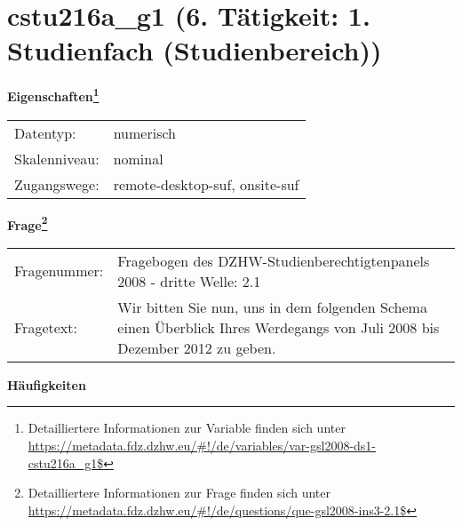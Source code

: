 
    \setcounter{footnote}{0}

    \vspace*{-1.8cm}
	\section{cstu216a\_g1 (6. Tätigkeit: 1. Studienfach (Studienbereich))}
	\label{section:cstu216a_g1}



    \vspace*{0.5cm}
    \noindent\textbf{Eigenschaften\footnote{Detailliertere Informationen zur Variable finden sich unter
		\url{https://metadata.fdz.dzhw.eu/\#!/de/variables/var-gsl2008-ds1-cstu216a_g1$}}}\\
	\begin{tabularx}{\hsize}{@{}lX}
	Datentyp: & numerisch \\
	Skalenniveau: & nominal \\
	Zugangswege: &
	  remote-desktop-suf, 
	  onsite-suf
 \\
    \end{tabularx}



				\vspace*{0.5cm}
                \noindent\textbf{Frage\footnote{Detailliertere Informationen zur Frage finden sich unter
		              \url{https://metadata.fdz.dzhw.eu/\#!/de/questions/que-gsl2008-ins3-2.1$}}}\\
				\begin{tabularx}{\hsize}{@{}lX}
					Fragenummer: &
					  Fragebogen des DZHW-Studienberechtigtenpanels 2008 - dritte Welle:
					  2.1
 \\
					Fragetext: & Wir bitten Sie nun, uns in dem folgenden Schema einen Überblick Ihres Werdegangs von Juli 2008 bis Dezember 2012 zu geben. \\
				\end{tabularx}





        		\vspace*{0.5cm}
                \noindent\textbf{Häufigkeiten}

